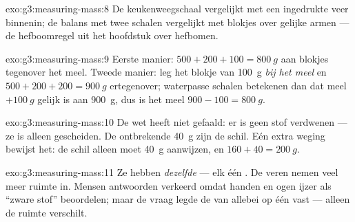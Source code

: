 \begin{solution}{exo:g3:measuring-mass:8}
De keukenweegschaal vergelijkt met een ingedrukte veer binnenin; de
balans met twee schalen vergelijkt met blokjes over gelijke armen ---
de hefboomregel uit het hoofdstuk over hefbomen.
\end{solution}

\begin{solution}{exo:g3:measuring-mass:9}
Eerste manier: $500 + 200 + 100 = \qty{800}{g}$ aan blokjes tegenover
het meel. Tweede manier: leg het blokje van \qty{100}{g} \emph{bij het
meel} en $500 + 200 + 200 = \qty{900}{g}$ ertegenover; waterpasse
schalen betekenen dan dat meel $+ \qty{100}{g}$ gelijk is aan
\qty{900}{g}, dus is het meel $900 - 100 = \qty{800}{g}$.
\end{solution}

\begin{solution}{exo:g3:measuring-mass:10}
De wet heeft niet gefaald: er is geen stof verdwenen --- ze is alleen
gescheiden. De ontbrekende \qty{40}{g} zijn de schil. Eén extra weging
bewijst het: de schil alleen moet \qty{40}{g} aanwijzen, en
$160 + 40 = \qty{200}{g}$.
\end{solution}

\begin{solution}{exo:g3:measuring-mass:11}
Ze hebben \emph{dezelfde}  --- elk één . De veren nemen
veel meer ruimte in. Mensen antwoorden verkeerd omdat handen en ogen
ijzer als ``zware stof'' beoordelen; maar de vraag legde de
 van allebei op één  vast --- alleen de ruimte
verschilt.
\end{solution}
